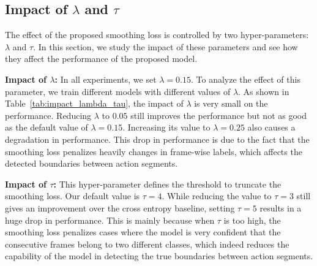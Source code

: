 \documentclass[10pt,twocolumn,letterpaper]{article}
\begin{document}
\subsection{Impact of $\lambda$ and $\tau$}

The effect of the proposed smoothing loss is controlled by two hyper-parameters: 
$\lambda$ and $\tau$. In this section, we study the impact of these parameters and 
see how they affect the performance of the proposed model.

\noindent\textbf{Impact of $\lambda$:} In all experiments, we set $\lambda=0.15$. To 
analyze the effect of this parameter, we train different models with different 
values of $\lambda$. As shown in Table~\ref{tab:impact_lambda_tau}, the impact 
of $\lambda$ is very small on the performance. Reducing $\lambda$ to $0.05$ 
still improves the performance but not as good as the default value of $\lambda=0.15$. 
Increasing its value to $\lambda=0.25$ also causes a degradation in 
performance. This drop in performance is due to the fact that the smoothing loss 
penalizes heavily changes in frame-wise labels, which affects the detected boundaries 
between action segments.

\noindent\textbf{Impact of $\tau$:} This hyper-parameter defines the threshold to truncate 
the smoothing loss. Our default value is $\tau=4$. While reducing the value to $\tau=3$ 
still gives an improvement over the cross entropy baseline, setting $\tau=5$ results 
in a huge drop in performance. This is mainly because when $\tau$ is too high, the smoothing 
loss penalizes cases where the model is very confident that the consecutive frames 
belong to two different classes, which indeed reduces the capability of the model in 
detecting the true boundaries between action segments.
\end{document}
